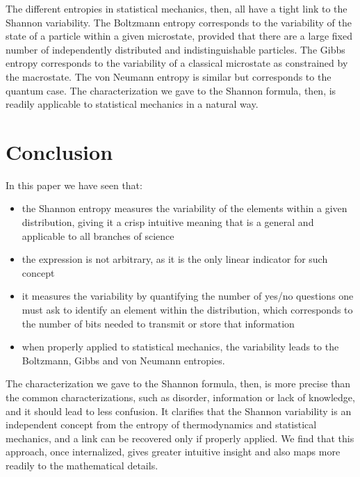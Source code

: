 \documentclass[prb, twocolumn]{revtex4-1}
\begin{document}
The different entropies in statistical mechanics, then, all have a tight link to the Shannon variability. The Boltzmann entropy corresponds to the variability of the state of a particle within a given microstate, provided that there are a large fixed number of independently distributed and indistinguishable particles. The Gibbs entropy corresponds to the variability of a classical microstate as constrained by the macrostate. The von Neumann entropy is similar but corresponds to the quantum case. The characterization we gave to the Shannon formula, then, is readily applicable to statistical mechanics in a natural way. 

\section{Conclusion}

In this paper we have seen that:
\begin{itemize}
	\item the Shannon entropy measures the variability of the elements within a given distribution, giving it a crisp intuitive meaning that is a general and applicable to all branches of science
	\item the expression is not arbitrary, as it is the only linear indicator for such concept
	\item it measures the variability by quantifying the number of yes/no questions one must ask to identify an element within the distribution, which corresponds to the number of bits needed to transmit or store that information
	\item when properly applied to statistical mechanics, the variability leads to the Boltzmann, Gibbs and von Neumann entropies.
\end{itemize}
The characterization we gave to the Shannon formula, then, is more precise than the common characterizations, such as disorder, information or lack of knowledge, and it should lead to less confusion. It clarifies that the Shannon variability is an independent concept from the entropy of thermodynamics and statistical mechanics, and a link can be recovered only if properly applied. We find that this approach, once internalized, gives greater intuitive insight and also maps more readily to the mathematical details.

  

\end{document}
